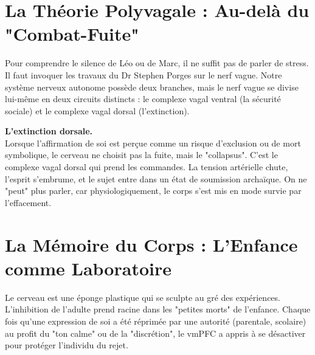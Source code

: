 \section{La Théorie Polyvagale : Au-delà du "Combat-Fuite"}
Pour comprendre le silence de Léo ou de Marc, il ne suffit pas de parler de stress. Il faut invoquer les travaux du Dr Stephen Porges sur le nerf vague. Notre système nerveux autonome possède deux branches, mais le nerf vague se divise lui-même en deux circuits distincts : le complexe vagal ventral (la sécurité sociale) et le complexe vagal dorsal (l'extinction).

\begin{NoteClinique}
\textbf{L'extinction dorsale.} \\
Lorsque l'affirmation de soi est perçue comme un risque d'exclusion ou de mort symbolique, le cerveau ne choisit pas la fuite, mais le "collapsus". C'est le complexe vagal dorsal qui prend les commandes. La tension artérielle chute, l'esprit s'embrume, et le sujet entre dans un état de soumission archaïque. On ne "peut" plus parler, car physiologiquement, le corps s'est mis en mode survie par l'effacement.
\end{NoteClinique}

\section{La Mémoire du Corps : L'Enfance comme Laboratoire}
Le cerveau est une éponge plastique qui se sculpte au gré des expériences. L'inhibition de l'adulte prend racine dans les "petites morts" de l'enfance. Chaque fois qu'une expression de soi a été réprimée par une autorité (parentale, scolaire) au profit du "ton calme" ou de la "discrétion", le vmPFC a appris à se désactiver pour protéger l'individu du rejet. 
